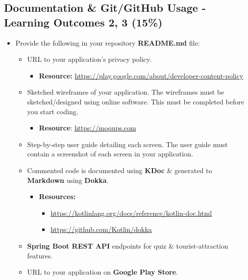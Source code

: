 \documentclass{article}
\begin{document}
\subsection*{Documentation \& Git/GitHub Usage - Learning Outcomes 2, 3 (15\%)}
\begin{itemize}
	\item Provide the following in your repository \textbf{README.md} file:
	      \begin{itemize}
		      \item URL to your application's privacy policy.
		      \begin{itemize}
						\item \textbf{Resource:} \footnotesize\href{https://play.google.com/about/developer-content-policy}{https://play.google.com/about/developer-content-policy}
					\end{itemize} 
		      \item Sketched wireframes of your application. The wireframes must be sketched/designed using online software. This must be completed before you start coding.
		            \begin{itemize}
			            \item \textbf{Resource}: \footnotesize\href{https://moqups.com}{https://moqups.com}
		            \end{itemize}
		      \item Step-by-step user guide detailing each screen. The user guide must contain a screenshot of each screen in your application.
		      \item Commented code is documented using \textbf{KDoc} \& generated to \textbf{Markdown} using \textbf{Dokka}.
		      \begin{itemize}
						\item \textbf{Resources:}
		            \begin{itemize}
			            \item \footnotesize\href{https://kotlinlang.org/docs/reference/kotlin-doc.html}{https://kotlinlang.org/docs/reference/kotlin-doc.html}
			            \item \footnotesize\href{https://github.com/Kotlin/dokka}{https://github.com/Kotlin/dokka}
		            \end{itemize}
					\end{itemize}
		      \item \textbf{Spring Boot REST API} endpoints for quiz \& tourist-attraction features.
		      \item URL to your application on \textbf{Google Play Store}.
	      \end{itemize}
			\end{itemize}
\end{document}
